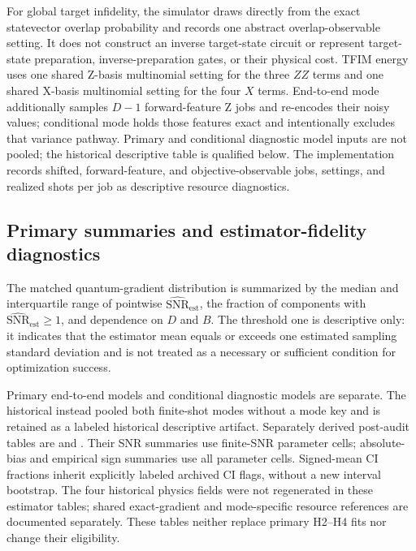 \documentclass[pdflatex,sn-mathphys-num,Numbered]{sn-jnl}
\newcommand{\snrest}{\widehat{\mathrm{SNR}}_{\mathrm{est}}}
\begin{document}
For global target infidelity, the simulator draws directly from the exact statevector overlap probability and records one abstract overlap-observable setting. It does not construct an inverse target-state circuit or represent target-state preparation, inverse-preparation gates, or their physical cost. TFIM energy uses one shared Z-basis multinomial setting for the three $ZZ$ terms and one shared X-basis multinomial setting for the four $X$ terms. End-to-end mode additionally samples $D-1$ forward-feature Z jobs and re-encodes their noisy values; conditional mode holds those features exact and intentionally excludes that variance pathway. Primary and conditional diagnostic model inputs are not pooled; the historical descriptive table is qualified below. The implementation records shifted, forward-feature, and objective-observable jobs, settings, and realized shots per job as descriptive resource diagnostics.

\subsection{Primary summaries and estimator-fidelity diagnostics}

The matched quantum-gradient distribution is summarized by the median and interquartile range of pointwise $\snrest$, the fraction of components with $\snrest\ge1$, and dependence on $D$ and $B$. The threshold one is descriptive only: it indicates that the estimator mean equals or exceeds one estimated sampling standard deviation and is not treated as a necessary or sufficient condition for optimization success.

Primary end-to-end models and conditional diagnostic models are separate. The historical  instead pooled both finite-shot modes without a mode key and is retained as a labeled historical descriptive artifact. Separately derived post-audit tables are  and . Their SNR summaries use finite-SNR parameter cells; absolute-bias and empirical sign summaries use all parameter cells. Signed-mean CI fractions inherit explicitly labeled archived CI flags, without a new interval bootstrap. The four historical physics fields were not regenerated in these estimator tables; shared exact-gradient and mode-specific resource references are documented separately. These tables neither replace primary H2--H4 fits nor change their eligibility.
\end{document}
